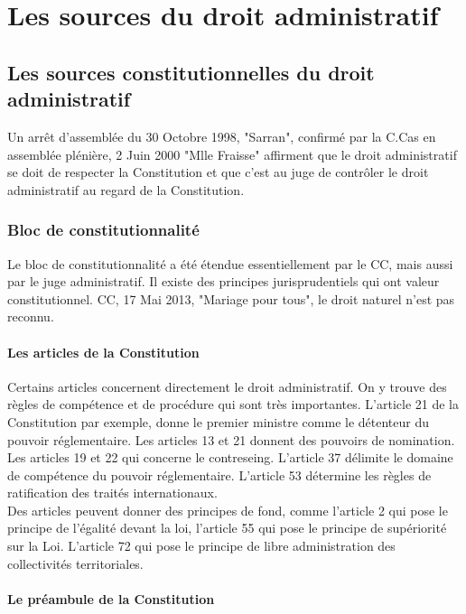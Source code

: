 \documentclass[10pt, a4paper, openany]{book}
\begin{document}
\part{Les sources du droit administratif}


\chapter{Les sources constitutionnelles du droit administratif}

Un arrêt d'assemblée du 30 Octobre 1998, "Sarran", confirmé par la C.Cas en assemblée plénière, 2 Juin 2000 "Mlle Fraisse" affirment que le droit administratif se doit de respecter la Constitution et que c'est au juge de contrôler le droit administratif au regard de la Constitution. 

\section{Bloc de constitutionnalité}

Le bloc de constitutionnalité a été étendue essentiellement par le CC, mais aussi par le juge administratif. Il existe des principes jurisprudentiels qui ont valeur constitutionnel. CC, 17 Mai 2013, "Mariage pour tous", le droit naturel n'est pas reconnu. 

\subsection{Les articles de la Constitution}

Certains articles concernent directement le droit administratif. On y trouve des règles de compétence et de procédure qui sont très importantes. L'article 21 de la Constitution par exemple, donne le premier ministre comme le détenteur du pouvoir réglementaire. Les articles 13 et 21 donnent des pouvoirs de nomination. Les articles 19 et 22 qui concerne le contreseing. L'article 37 délimite le domaine de compétence du pouvoir réglementaire. L'article 53 détermine les règles de ratification des traités internationaux. \\
Des articles peuvent donner des principes de fond, comme l'article 2 qui pose le principe de l'égalité devant la loi, l'article 55 qui pose le principe de supériorité sur la Loi. L'article 72 qui pose le principe de libre administration des collectivités territoriales. 

\subsection{Le préambule de la Constitution}
\end{document}
